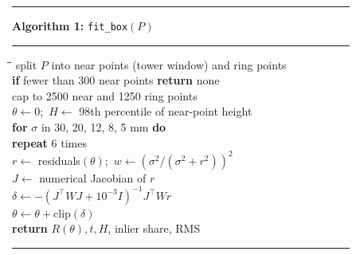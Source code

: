\documentclass[conference,10pt]{IEEEtran}
\begin{document}
\begin{figure}[!t]\centering\footnotesize
\begin{minipage}{\columnwidth}\hrule\smallskip
\textbf{Algorithm 1:} \texttt{fit\_box}$(P)$\smallskip\hrule\smallskip
\begin{tabbing}
\hspace{3mm}\=\hspace{3mm}\=\hspace{3mm}\=\kill
split $P$ into near points (tower window) and ring points\\
\textbf{if} fewer than 300 near points \textbf{return} none\\
cap to 2500 near and 1250 ring points\\
$\theta\gets0$;\ $H\gets$ 98th percentile of near-point height\\
\textbf{for} $\sigma$ in 30, 20, 12, 8, 5 mm \textbf{do}\\
\>\textbf{repeat} 6 times\\
\>\>$r\gets$ residuals$(\theta)$;\ $w\gets(\sigma^2/(\sigma^2+r^2))^2$\\
\>\>$J\gets$ numerical Jacobian of $r$\\
\>\>$\delta\gets-(J^\top WJ+10^{-3}I)^{-1}J^\top Wr$\\
\>\>$\theta\gets\theta+\mathrm{clip}(\delta)$\\
\textbf{return} $R(\theta),t,H$, inlier share, RMS
\end{tabbing}\hrule
\end{minipage}
\end{figure}
\end{document}
